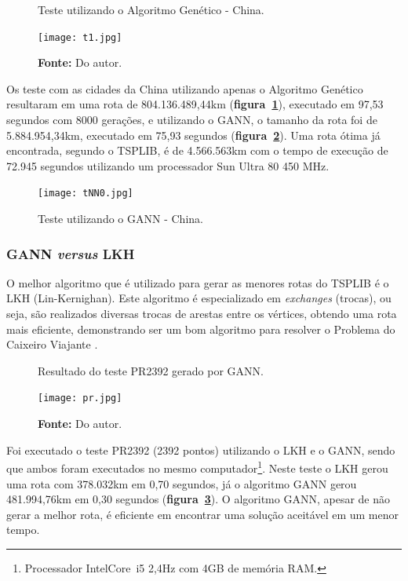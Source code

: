 \documentclass[12pt,openright,a4paper,oneside]{tcc}
\begin{document}
   		\begin{figure}[h]
			\centering
            \caption{Teste utilizando o Algoritmo Genético - China.}
	        \texttt{[image: t1.jpg]}
	        \caption*{\textbf{Fonte:} Do autor.}
	        \label{figt1}
   		\end{figure}

        Os teste com as cidades da China utilizando apenas o Algoritmo Genético resultaram em uma rota de 804.136.489,44km (\textbf{figura~\ref{figt1}}), executado em 97,53 segundos com 8000 gerações, e utilizando o GANN, o tamanho da rota foi de 5.884.954,34km, executado em 75,93 segundos (\textbf{figura~\ref{figtNN0}}). Uma rota ótima já encontrada, segundo o TSPLIB, é de 4.566.563km com o tempo de execução de 72.945 segundos utilizando um processador Sun Ultra 80 450 MHz.
        \begin{figure}[h]
            \centering
            \caption{Teste utilizando o GANN - China.}
            \texttt{[image: tNN0.jpg]}
            \label{figtNN0}
        \end{figure}

        
   		\subsubsection{GANN \textit{versus} LKH}

		O melhor algoritmo que é utilizado para gerar as menores rotas do TSPLIB é o LKH (Lin-Kernighan). Este algoritmo é especializado em \textit{exchanges} (trocas), ou seja, são realizados diversas trocas de arestas entre os vértices, obtendo uma rota mais eficiente, demonstrando ser um bom algoritmo para resolver o Problema do Caixeiro Viajante \cite{LKH}. 

		\begin{figure}[h]
			\centering
            \caption{Resultado do teste PR2392 gerado por GANN.}
		    \texttt{[image: pr.jpg]}
		    \caption*{\textbf{Fonte:} Do autor.}
		    \label{figpa}
		\end{figure}

		Foi executado o teste PR2392 (2392 pontos) utilizando o LKH e o GANN, sendo que ambos foram executados no mesmo computador\footnote{Processador Intel\textregistered Core\texttrademark ~i5 2,4Hz com 4GB de memória RAM.}. Neste teste o LKH gerou uma rota com 378.032km em 0,70 segundos, já o algoritmo GANN gerou 481.994,76km em 0,30 segundos (\textbf{figura~\ref{figpa}}).
		O algoritmo GANN, apesar de não gerar a melhor rota, é eficiente em encontrar uma solução aceitável em um menor tempo.
\end{document}
